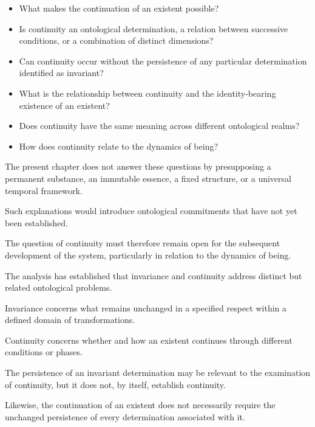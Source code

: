 \begin{itemize}
    \item What makes the continuation
    of an existent possible?

    \item Is continuity an ontological
    determination, a relation between
    successive conditions, or a
    combination of distinct dimensions?

    \item Can continuity occur without
    the persistence of any particular
    determination identified as invariant?

    \item What is the relationship
    between continuity and the
    identity-bearing existence
    of an existent?

    \item Does continuity have the
    same meaning across different
    ontological realms?

    \item How does continuity relate
    to the dynamics of being?
\end{itemize}

The present chapter does not answer
these questions by presupposing
a permanent substance, an immutable
essence, a fixed structure, or
a universal temporal framework.

Such explanations would introduce
ontological commitments that have
not yet been established.

The question of continuity must
therefore remain open for the
subsequent development of the
system, particularly in relation
to the dynamics of being.


The analysis has established that
invariance and continuity address
distinct but related ontological
problems.

Invariance concerns what remains
unchanged in a specified respect
within a defined domain of
transformations.

Continuity concerns whether and
how an existent continues through
different conditions or phases.

The persistence of an invariant
determination may be relevant
to the examination of continuity,
but it does not, by itself,
establish continuity.

Likewise, the continuation of
an existent does not necessarily
require the unchanged persistence
of every determination associated
with it.

